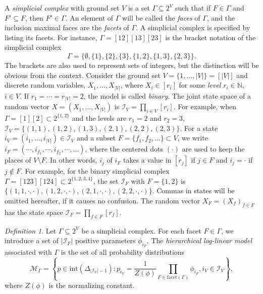 \documentclass[a4paper,12pt]{article}
\theoremstyle{plain}
\theoremstyle{remark}
\newtheorem{definition}[theorem]{Definition}
\begin{document}
A {\it simplicial complex} with ground set $V$ is a set
$\Gamma\subseteq 2^V$ such that if $F\in\Gamma$ and
$F'\subseteq F$, then $F'\in\Gamma$. An element of $\Gamma$
will be called the {\it faces} of $\Gamma$, and the inclusion
maximal faces are the {\it facets} of $\Gamma$. A simplicial
complex is specified by listing its facets. For instance,
$\Gamma=[12][13][23]$ is the bracket notation of the simplicial
complex
\[
  \Gamma=\{\emptyset,\{1\},\{2\},\{3\},\{1,2\},\{1,3\},\{2,3\}\}.
\]
The brackets are also used to represent sets of integers, but
the distinction will be obvious from the context. Consider
the ground set $V=\{1,\ldots,|V|\}=[|V|]$ and
discrete random variables, $X_1,\ldots,X_{|V|}$, where $X_i\in[r_i]$
for some {\it level} $r_i\in\mathbb{N}$, $i\in V$.
If $r_1=\cdots=r_{|V|}=2$, the model is called {\it binary}.
The joint state space of a random vector $X=(X_1,\ldots,X_{|V|})$
is $\mathcal{I}_V=\prod_{i\in V}[r_i]$. For example, when
$\Gamma=[1][2]\subset 2^{\{1,2\}}$ and the levels are $r_1=2$
and $r_2=3$,
$\mathcal{I}_V=\{(1,1),(1,2),(1,3),(2,1),(2,2),(2,3)\}$.
For a state $i_V=(i_1,\ldots,i_{|V|})\in\mathcal{I}_V$ and
a subset $F=\{f_1,f_2,\ldots\}\subset V$, we write
$i_F=(\cdots,i_{f_1},\cdots,i_{f_2},\cdots,\ldots)$,
where the centered dots $(\cdot)$ are used to keep the places
of $V\setminus F$. In other words, $i_j$ of $i_F$ takes
a value in $[r_j]$ if $j\in F$ and $i_j=\cdot$ if $j\notin F$.
For example, for the binary simplicial complex
$\Gamma=[123][124]\subset 2^{\{1,2,3,4\}}$,
the set $\mathcal{I}_F$ with $F=\{1,2\}$ is
$\{(1,1,\cdot,\cdot),(1,2,\cdot,\cdot),(2,1,\cdot,\cdot),(2,2,\cdot,\cdot)\}$.
Commas in states will be omitted hereafter, if it causes
no confusion. The random vector $X_F=(X_f)_{f\in F}$ has
the state space $\mathcal{I}_F=\prod_{f\in F}[r_f]$.

\begin{definition}\label{defi:log-lin}
  Let $\Gamma\subseteq 2^V$ be a simplicial complex. For each
  facet $F\in\Gamma$, we introduce a set of $|\mathcal{I}_F|$
  positive parameters $\phi_{i_F}$.
  The {\it hierarchical log-linear model} associated with
  $\Gamma$ is the set of all probability distributions
  \begin{equation}\label{para2}
    \mathcal{M}_\Gamma=
    \left\{
      p\in\text{int}(\Delta_{|\mathcal{I}_V|-1}):
      p_{i_V}=\frac{1}{Z(\phi)}\prod_{F\in\text{facet}(\Gamma)}
      \phi_{i_F}, i_V \in \mathcal{I}_V
    \right\},
  \end{equation}
  where $Z(\phi)$ is the normalizing constant.
\end{definition}
\end{document}
